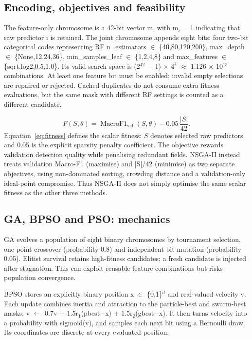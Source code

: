 \documentclass[10pt,a4paper,twocolumn]{extarticle}
\begin{document}
\subsection{Encoding, objectives and feasibility}
The feature-only chromosome is a 42-bit vector m, with m$_i$ = 1 indicating that raw predictor i is retained. The joint chromosome appends eight bits: four two-bit categorical codes representing RF n\_estimators $\in$ \{40,80,120,200\}, max\_depth $\in$ \{None,12,24,36\}, min\_samples\_leaf $\in$ \{1,2,4,8\} and max\_features $\in$ \{sqrt,log2,0.5,1.0\}. Its valid search space is (2$^{42}$ $-$ 1) $\times$ $4^4$ $\approx$ 1.126 $\times$ 10$^{15}$ combinations. At least one feature bit must be enabled; invalid empty selections are repaired or rejected. Cached duplicates do not consume extra fitness evaluations, but the same mask with different RF settings is counted as a different candidate.

\begin{equation}\label{eq:fitness}F(S,\theta)=\operatorname{MacroF1}_{\mathrm{val}}(S,\theta)-0.05\,\frac{|S|}{42}.\end{equation}
Equation~\eqref{eq:fitness} defines the scalar fitness: $S$ denotes selected raw predictors and 0.05 is the explicit sparsity penalty coefficient. The objective rewards validation detection quality while penalising redundant fields. NSGA-II instead treats validation Macro-F1 (maximise) and |S|/42 (minimise) as two separate objectives, using non-dominated sorting, crowding distance and a validation-only ideal-point compromise. Thus NSGA-II does not simply optimise the same scalar fitness as the other three methods.

\subsection{GA, BPSO and PSO: mechanics}
GA evolves a population of eight binary chromosomes by tournament selection, one-point crossover (probability 0.8) and independent bit mutation (probability 0.05). Elitist survival retains high-fitness candidates; a fresh candidate is injected after stagnation. This can exploit reusable feature combinations but risks population convergence.

BPSO stores an explicitly binary position x $\in$ \{0,1\}$^d$ and real-valued velocity v. Each update combines inertia and attraction to the particle-best and swarm-best masks: v $\leftarrow$ 0.7v + 1.5r$_1$(pbest$-$x) + 1.5r$_2$(gbest$-$x). It then turns velocity into a probability with sigmoid(v), and samples each next bit using a Bernoulli draw. Its coordinates are discrete at every evaluated position.
\end{document}
